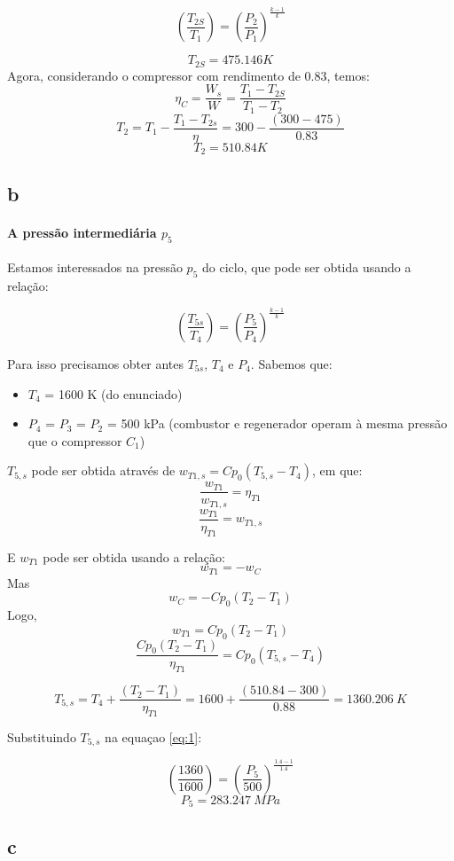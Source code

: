 \[\left( \frac{T_{2S}}{T_{1}}   \right) = \left( \frac{P_{2}}{P_{1}} \right)^{\frac{k-1}{k}} \]

\[T_{2S} = 475.146 K\]
Agora, considerando o compressor com rendimento de 0.83, temos:
\[\eta _{C} = \frac{W_{s}}{W} = \frac{T_{1} - T_{2S}}{T_{1} - T_{2}}\]
\[T_{2} = T_{1} - \frac{T_{1}-T_{2s}}{\eta} = 300 - \frac{(300-475)}{0.83}\]
\[T_{2} = 510.84 K\]

\subsection{b}
\paragraph*{A pressão intermediária $p_{5}$}
Estamos interessados na pressão $p_{5}$ do ciclo, que pode ser obtida usando a relação:

\begin{equation}
\left( \frac{T_{5s}}{T_{4}}   \right) = \left( \frac{P_{5}}{P_{4}} \right)^{\frac{k-1}{k}} 
\label{eq:1}
\end{equation}


Para isso precisamos obter antes $T_{5s}$, $T_{4}$ e $P_{4}$. Sabemos que:

\begin{itemize}
\item $T_{4}$ = 1600 K (do enunciado)
\item $P_{4}$ = $P_{3}$ = $P_{2}$ = 500 kPa (combustor e regenerador operam à mesma pressão que o compressor $C_{1}$)
\end{itemize}

$T_{5,s}$ pode ser obtida através de $w_{T1,s} = Cp_{0}(T_{5,s}-T_{4})$, em que:
\[\frac{w_{T1}}{w_{T1,s}} = \eta _{T1}  \]
\[\frac{w_{T1}}{ \eta _{T1} } =  w_{T1,s}   \]

E $w_{T1}$ pode ser obtida usando a relação:
\[ w_{T1} = -w_{C} \]
Mas 
\[w_{C} = -Cp_{0}(T_{2}-T_{1})\]
Logo,
\[w_{T1} = Cp_{0}(T_{2}-T_{1})\]
\[\frac{Cp_{0}(T_{2}-T_{1})}{ \eta _{T1} } =  Cp_{0}(T_{5,s}-T_{4})  \]

\[T_{5,s} = T_{4} + \frac{(T_{2}-T_{1})}{ \eta _{T1} } = 1600 + \frac{(510.84-300)}{ 0.88 } = 1360.206 \ K \]

Substituindo $T_{5,s}$ na equaçao \ref{eq:1}:

\[\left( \frac{1360}{1600}   \right) = \left( \frac{P_{5}}{500} \right)^{\frac{1.4-1}{1.4}} \]
\[P_{5} = 283.247 \ MPa\]

\subsection{c}
